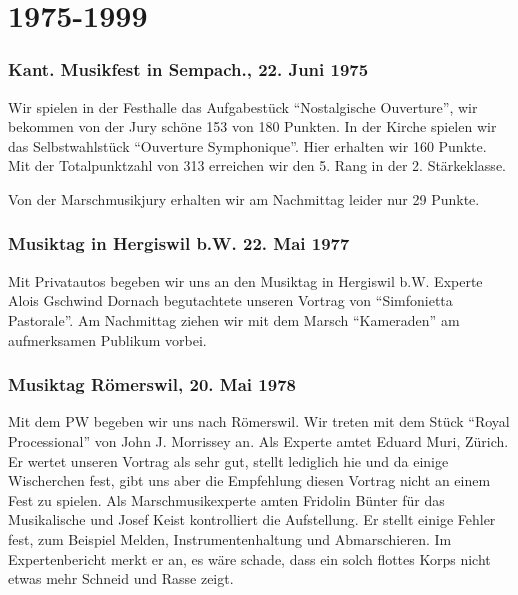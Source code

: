 \section*{1975-1999}

\begin{history}

    \subsubsection*{Kant. Musikfest in Sempach., 22. Juni 1975}

    Wir spielen in der Festhalle das Aufgabestück \enquote{Nostalgische
        Ouverture}, wir bekommen von der Jury schöne 153 von 180 Punkten. In der
    Kirche spielen wir das Selbstwahlstück \enquote{Ouverture Symphonique}.
    Hier erhalten wir 160 Punkte. Mit der Totalpunktzahl von 313 erreichen
    wir den 5. Rang in der 2. Stärkeklasse.

    Von der Marschmusikjury erhalten wir am Nachmittag leider nur 29 Punkte.


    \subsubsection*{Musiktag in Hergiswil b.W. 22. Mai 1977}

    Mit Privatautos begeben wir uns an den Musiktag in Hergiswil b.W. Experte
    Alois Gschwind Dornach begutachtete unseren Vortrag von \enquote{Simfonietta
        Pastorale}. Am Nachmittag ziehen wir mit dem Marsch \enquote{Kameraden} am
    aufmerksamen Publikum vorbei.


    \subsubsection*{Musiktag Römerswil, 20. Mai 1978}

    Mit dem PW begeben wir uns nach Römerswil. Wir treten mit dem Stück
    \enquote{Royal Processional} von John J. Morrissey an. Als Experte amtet
    Eduard Muri, Zürich. Er wertet unseren Vortrag als sehr gut, stellt
    lediglich hie und da einige Wischerchen fest, gibt uns aber die Empfehlung
    diesen Vortrag nicht an einem Fest zu spielen. Als Marschmusikexperte amten
    Fridolin Bünter für das Musikalische und Josef Keist kontrolliert die
    Aufstellung. Er stellt einige Fehler fest, zum Beispiel Melden,
    Instrumentenhaltung und Abmarschieren. Im Expertenbericht merkt er an, es
    wäre schade, dass ein solch flottes Korps nicht etwas mehr Schneid und Rasse
    zeigt.



\end{history}
